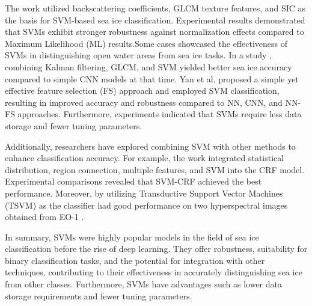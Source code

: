 The work\cite{59liu2014svm} utilized backscattering coefficients, GLCM texture features, and SIC as the basis for SVM-based sea ice classification. Experimental results demonstrated that SVMs exhibit stronger robustness against normalization effects compared to Maximum Likelihood (ML) results.Some cases\cite{61zakhvatkina2017operational,62liu2016approach,63hong2018automatic,68li2020extraction} showcased the effectiveness of SVMs in distinguishing open water areas from sea ice tasks. In a study \cite{64zhang2019sea}, combining Kalman filtering, GLCM, and SVM yielded better sea ice accuracy compared to simple CNN models at that time. Yan et al. \cite{66yan2019detecting,67yan2019sea} proposed a simple yet effective feature selection (FS) approach and employed SVM classification, resulting in improved accuracy and robustness compared to NN, CNN, and NN-FS approaches. Furthermore, experiments indicated that SVMs require less data storage and fewer tuning parameters.

Additionally, researchers have explored combining SVM with other methods to enhance classification accuracy. For example, the work \cite{60zhu2016antarctic} integrated statistical distribution, region connection, multiple features, and SVM into the CRF model. Experimental comparisons revealed that SVM-CRF achieved the best performance. Moreover, by utilizing Transductive Support Vector Machines (TSVM) as the classifier had good performance on two hyperspectral images obtained from EO-1 \cite{65han2019cooperative}.

In summary, SVMs were highly popular models in the field of sea ice classification before the rise of deep learning. They offer robustness, suitability for binary classification tasks, and the potential for integration with other techniques, contributing to their effectiveness in accurately distinguishing sea ice from other classes. Furthermore, SVMs have advantages such as lower data storage requirements and fewer tuning parameters.


